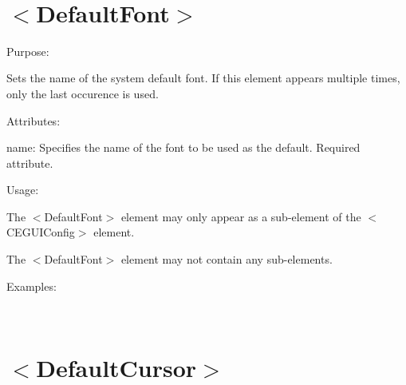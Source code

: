 ~\newline
 \hypertarget{xml_config_xml_config_font}{}\section{$<$\+Default\+Font$>$}\label{xml_config_xml_config_font}

\begin{DoxyItemize}
\item Purpose\+:
\begin{DoxyItemize}
\item Sets the name of the system default font. If this element appears multiple times, only the last occurence is used.
\end{DoxyItemize}
\item Attributes\+:
\begin{DoxyItemize}
\item {\ttfamily name\+:} Specifies the name of the font to be used as the default. Required attribute.
\end{DoxyItemize}
\item Usage\+:
\begin{DoxyItemize}
\item The $<$Default\+Font$>$ element may only appear as a sub-\/element of the $<$C\+E\+G\+U\+I\+Config$>$ element.
\item The $<$Default\+Font$>$ element may not contain any sub-\/elements.
\end{DoxyItemize}
\item Examples\+:
\end{DoxyItemize}

~\newline
 \hypertarget{xml_config_xml_config_cursor}{}\section{$<$\+Default\+Cursor$>$}\label{xml_config_xml_config_cursor}


